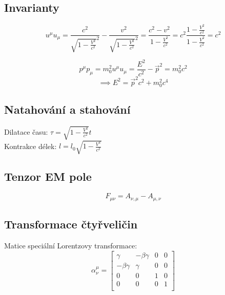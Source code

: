 \documentclass[a5paper,12pt]{article}
\begin{document}
\subsection{Invarianty}

\begin{equation*}
 u^\mu u_\mu = \frac{c^2}{\sqrt{1 - \frac{V^2}{c^2}}^2} - \frac{v^2}{\sqrt{1 - \frac{V^2}{c^2}}^2} = \frac{c^2 - v^2}{1 - \frac{V^2}{c^2} } = c^2 \frac{ 1 - \frac{V^2}{c^2} }{ 1 - \frac{V^2}{c^2} } = c^2
\end{equation*}

\begin{equation*}
 p^\mu p_\mu = m_{0}^{2} u^\mu u_\mu = \frac{E^2}{c^2} - \vec{p}^2 = m_{0}^{2}c^2
\end{equation*}
\begin{equation*}
 \implies E^2 = \vec{p}^2 c^2 + m_0^2 c^4
\end{equation*}

\subsection{Natahování a stahování}

Dilatace času: $\tau = \sqrt{ 1 - \frac{V^2}{c^2} } t$\\
Kontrakce délek: $l = l_0 \sqrt{ 1 - \frac{V^2}{c^2} }$

\subsection{Tenzor EM pole}

\begin{equation*}
F_{\mu \nu} = A_{\nu, \mu} - A_{\mu, \nu}
\end{equation*}

\subsection{Transformace čtyřveličin}

Matice speciální Lorentzovy transformace:
\begin{equation*}
\alpha_{\nu}^{\mu} = \begin{bmatrix}\gamma&-\beta \gamma&0&0\\-\beta \gamma&\gamma&0&0\\0&0&1&0\\0&0&0&1\\\end{bmatrix}
\end{equation*}
\end{document}
